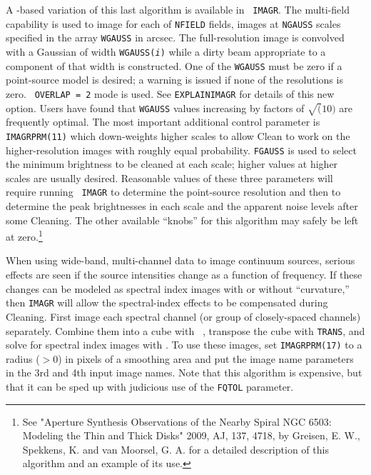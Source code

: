      A \uv-based variation of this last algorithm is available in {\tt
IMAGR}\@.  The multi-field capability is used to image for each of
{\tt NFIELD} fields, images at {\tt NGAUSS} scales specified in
the array {\tt WGAUSS} in arcsec.  The full-resolution image is
convolved with a Gaussian of width {\tt WGAUSS({\it i\/})} while a
dirty beam appropriate to a component of that width is constructed.
One of the {\tt WGAUSS} must be zero if a point-source model is
desired; a warning is issued if none of the resolutions is zero.  {\tt
OVERLAP = 2} mode is used.  See {\tt EXPLAIN\qs IMAGR} for details of
this new option.   Users have found that {\tt WGAUSS} values
increasing by factors of $\sqrt(10)$ are frequently optimal.  The most
important additional control parameter is {\tt IMAGRPRM(11)} which
down-weights higher scales to allow Clean to work on the
higher-resolution images with roughly equal probability.  {\tt FGAUSS}
is used to select the minimum brightness to be cleaned at each
scale; higher values at higher scales are usually desired.
Reasonable values of these three parameters will require running {\tt
IMAGR} to determine the point-source resolution and then to determine
the peak brightnesses in each scale and the apparent noise levels
after some Cleaning.  The other available ``knobs'' for this algorithm
may safely be left at zero.\footnote{See "Aperture Synthesis
Observations of the Nearby Spiral NGC 6503: Modeling the Thin and
Thick Disks" 2009, AJ, 137, 4718, by Greisen, E. W., Spekkens, K. and
van Moorsel, G. A. for a detailed description of this algorithm and an
example of its use.}


     When using wide-band, multi-channel data to image continuum
sources, serious effects are seen if the source intensities change as
a function of frequency.  If these changes can be modeled as spectral
index images with or without ``curvature,'' then {\tt IMAGR} will
allow the spectral-index effects to be compensated during Cleaning.
First image each spectral channel (or group of closely-spaced
channels) separately.  Combine them into a cube with {\tt
{}}, transpose the cube with {\tt TRANS}, and solve for
spectral index images with {\tt {}}\@.  To use these images,
set {\tt IMAGRPRM(17)} to a radius ($> 0$) in pixels of a smoothing
area and put the image name parameters in the 3rd and 4th input image
names.  Note that this algorithm is expensive, but that it can be sped
up with judicious use of the {\tt FQTOL} parameter.

